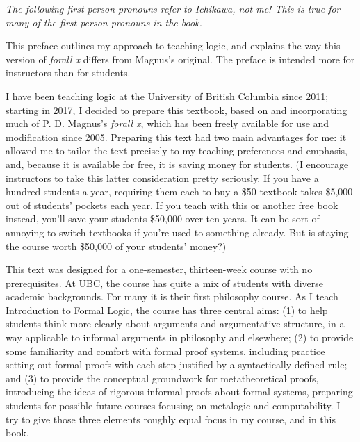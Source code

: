 \textit{The following first person pronouns refer to Ichikawa, not me! This is true for many of the first person pronouns in the book.}

This preface outlines my approach to teaching logic, and explains the way this version of \emph{forall x} differs from Magnus's original. The preface is intended more for instructors than for students. 

I have been teaching logic at the University of British Columbia since 2011; starting in 2017, I decided to prepare this textbook, based on and incorporating much of P. D. Magnus's \emph{forall x}, which has been freely available for use and modification since 2005. Preparing this text had two main advantages for me: it allowed me to tailor the text precisely to my teaching preferences and emphasis, and, because it is available for free, it is saving money for students. (I encourage instructors to take this latter consideration pretty seriously. If you have a hundred students a year, requiring them each to buy a \$50 textbook takes \$5,000 out of students' pockets each year. If you teach with this or another free book instead, you'll save your students \$50,000 over ten years. It can be sort of annoying to switch textbooks if you're used to something already. But is staying the course worth \$50,000 of your students' money?)

This text was designed for a one-semester, thirteen-week course with no prerequisites. At UBC, the course has quite a mix of students with diverse academic backgrounds. For many it is their first philosophy course. As I teach Introduction to Formal Logic, the course has three central aims: (1) to help students think more clearly about arguments and argumentative structure, in a way applicable to informal arguments in philosophy and elsewhere; (2) to provide some familiarity and comfort with formal proof systems, including practice setting out formal proofs with each step justified by a syntactically-defined rule; and (3) to provide the conceptual groundwork for metatheoretical proofs, introducing the ideas of rigorous informal proofs about formal systems, preparing students for possible future courses focusing on metalogic and computability. I try to give those three elements roughly equal focus in my course, and in this book.

